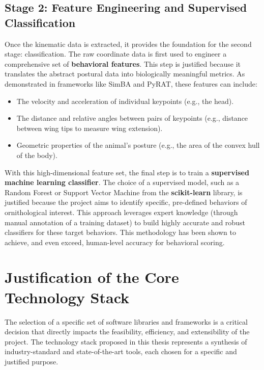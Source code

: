 \subsection{Stage 2: Feature Engineering and Supervised Classification}
Once the kinematic data is extracted, it provides the foundation for the second stage: classification. The raw coordinate data is first used to engineer a comprehensive set of \textbf{behavioral features}. This step is justified because it translates the abstract postural data into biologically meaningful metrics. As demonstrated in frameworks like SimBA and PyRAT, these features can include:
\begin{itemize}
    \item The velocity and acceleration of individual keypoints (e.g., the head).
    \item The distance and relative angles between pairs of keypoints (e.g., distance between wing tips to measure wing extension).
    \item Geometric properties of the animal's posture (e.g., the area of the convex hull of the body).
\end{itemize}
With this high-dimensional feature set, the final step is to train a \textbf{supervised machine learning classifier}. The choice of a supervised model, such as a Random Forest or Support Vector Machine from the \textbf{scikit-learn} library, is justified because the project aims to identify specific, pre-defined behaviors of ornithological interest. This approach leverages expert knowledge (through manual annotation of a training dataset) to build highly accurate and robust classifiers for these target behaviors. This methodology has been shown to achieve, and even exceed, human-level accuracy for behavioral scoring.

\section{Justification of the Core Technology Stack}

The selection of a specific set of software libraries and frameworks is a critical decision that directly impacts the feasibility, efficiency, and extensibility of the project. The technology stack proposed in this thesis represents a synthesis of industry-standard and state-of-the-art tools, each chosen for a specific and justified purpose.

